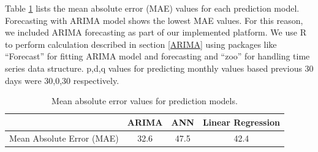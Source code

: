 Table \ref{tab:mae} lists the mean absolute error (MAE) values for each prediction model. Forecasting with ARIMA model shows the lowest MAE values. For this reason, we included ARIMA forecasting as part of our implemented platform. We use R to perform calculation described in section \ref{ARIMA} using packages like ``Forecast'' for fitting ARIMA model and forecasting and ``zoo'' for handling time series data structure. p,d,q values for predicting monthly values based previous 30 days were 30,0,30 respectively.

\begin{center}
\begin{table}[!ht] 
\begin{tabular} { | l | c | c | c | } 

\hline
	 & ARIMA & ANN & Linear Regression \\ \hline
	Mean Absolute Error (MAE) & 32.6 & 47.5 & 42.4 \\ \hline
\end{tabular}
\caption{Mean absolute error values for prediction models.}
\label{tab:mae}
\end{table}
\end{center}

  